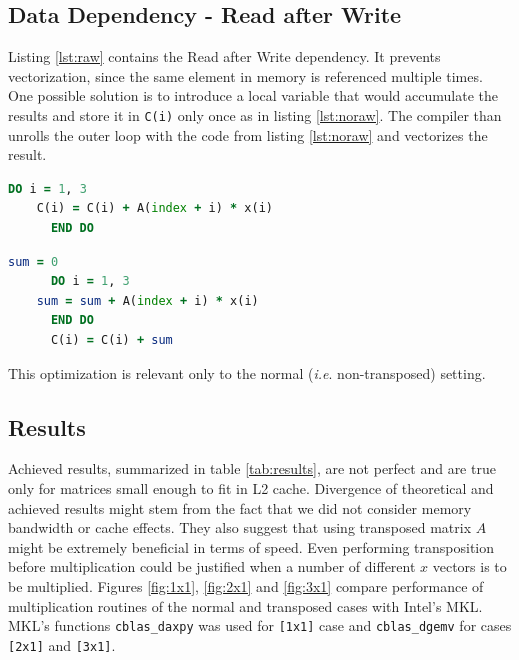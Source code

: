 \documentclass[journal, a4paper]{IEEEtran}
\begin{document}
  \subsection{Data Dependency - Read after Write}
    Listing \ref{lst:raw} contains the Read after Write dependency. It prevents vectorization, since the same element in memory is referenced multiple times. One possible solution is to introduce a local variable that would accumulate the results and store it in \texttt{C(i)} only once as in listing \ref{lst:noraw}. The compiler than unrolls the outer loop with the code from listing \ref{lst:noraw} and vectorizes the result.
    \begin{lstlisting}[language=Fortran,label=lst:raw, caption=Read after Write dependency.]
      DO i = 1, 3
	C(i) = C(i) + A(index + i) * x(i)
      END DO
    \end{lstlisting}
    
    \begin{lstlisting}[language=Fortran,label=lst:noraw, caption=Read after Write dependency resolved.]
      sum = 0
      DO i = 1, 3
	sum = sum + A(index + i) * x(i)
      END DO
      C(i) = C(i) + sum
    \end{lstlisting}
    
    This optimization is relevant only to the normal (\textit{i.e}. non-transposed) setting.
    
   \subsection{Results}  
    Achieved results, summarized in table \ref{tab:results}, are not perfect and are true only for matrices small enough to fit in L2 cache. Divergence of theoretical and achieved results might stem from the fact that we did not consider memory bandwidth or cache effects. They also suggest that using transposed matrix $A$ might be extremely beneficial in terms of speed. Even performing transposition before multiplication could be justified when a number of different $x$ vectors is to be multiplied. Figures \ref{fig:1x1}, \ref{fig:2x1} and \ref{fig:3x1} compare performance of multiplication routines of the normal and transposed cases with Intel's MKL. MKL's functions \texttt{cblas\_daxpy} was used for \texttt{[1x1]} case and \texttt{cblas\_dgemv} for cases \texttt{[2x1]} and \texttt{[3x1]}.
  
\end{document}
